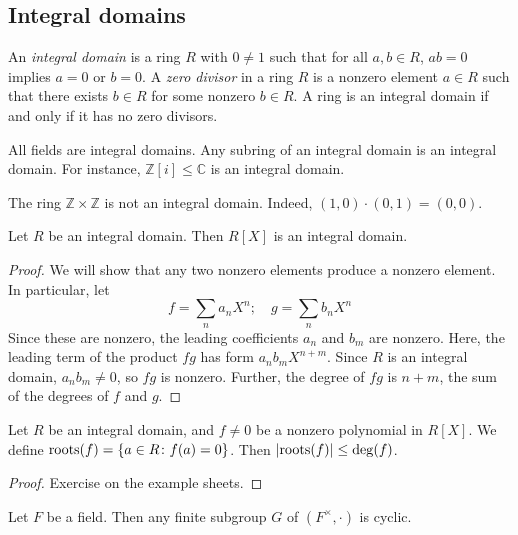 \subsection{Integral domains}
\begin{definition}
	An \textit{integral domain} is a ring \( R \) with \( 0 \neq 1 \) such that for all \( a, b \in R \), \( a b = 0 \) implies \( a = 0 \) or \( b = 0 \).
	A \textit{zero divisor} in a ring \( R \) is a nonzero element \( a \in R \) such that there exists \( b \in R \) for some nonzero \( b \in R \).
	A ring is an integral domain if and only if it has no zero divisors.
\end{definition}
\begin{example}
	All fields are integral domains.
	Any subring of an integral domain is an integral domain.
	For instance, \( \mathbb Z[i] \leq \mathbb C \) is an integral domain.
\end{example}
\begin{example}
	The ring \( \mathbb Z \times \mathbb Z \) is not an integral domain.
	Indeed, \( (1,0) \cdot (0,1) = (0,0) \).
\end{example}
\begin{lemma}
	Let \( R \) be an integral domain.
	Then \( R[X] \) is an integral domain.
\end{lemma}
\begin{proof}
	We will show that any two nonzero elements produce a nonzero element.
	In particular, let
	\[ f = \sum_n a_n X^n;\quad g = \sum_n b_n X^n \]
	Since these are nonzero, the leading coefficients \( a_n \) and \( b_m \) are nonzero.
	Here, the leading term of the product \( fg \) has form \( a_n b_m X^{n+m} \).
	Since \( R \) is an integral domain, \( a_n b_m \neq 0 \), so \( fg \) is nonzero.
	Further, the degree of \( fg \) is \( n + m \), the sum of the degrees of \( f \) and \( g \).
\end{proof}
\begin{lemma}
	Let \( R \) be an integral domain, and \( f \neq 0 \) be a nonzero polynomial in \( R[X] \).
	We define \( \mathrm{roots}(f) = \qty{a \in R \colon f(a) = 0} \).
	Then \( \abs{\mathrm{roots}(f)} \leq \mathrm{deg}(f) \).
\end{lemma}
\begin{proof}
	Exercise on the example sheets.
\end{proof}
\begin{theorem}
	Let \( F \) be a field.
	Then any finite subgroup \( G \) of \( (F^\times, \cdot) \) is cyclic.
\end{theorem}
